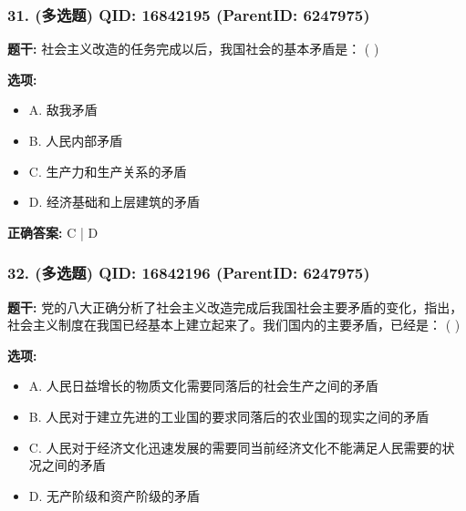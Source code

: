 \documentclass[12pt,UTF8]{ctexart}
\begin{document}
\vspace{0.3em}\hrulefill\vspace{0.7em}

\subsubsection*{31. (多选题) \small QID: 16842195 (ParentID: 6247975)}

\textbf{题干:}
社会主义改造的任务完成以后，我国社会的基本矛盾是： ( )



\textbf{选项:}
\begin{itemize}[leftmargin=*]

  \item A. 敌我矛盾

  \item B. 人民内部矛盾

  \item C. 生产力和生产关系的矛盾

  \item D. 经济基础和上层建筑的矛盾

\end{itemize}

\textbf{正确答案:}
C | D

\vspace{0.3em}\hrulefill\vspace{0.7em}

\subsubsection*{32. (多选题) \small QID: 16842196 (ParentID: 6247975)}

\textbf{题干:}
党的八大正确分析了社会主义改造完成后我国社会主要矛盾的变化，指出，社会主义制度在我国已经基本上建立起来了。我们国内的主要矛盾，已经是： ( )



\textbf{选项:}
\begin{itemize}[leftmargin=*]

  \item A. 人民日益增长的物质文化需要同落后的社会生产之间的矛盾

  \item B. 人民对于建立先进的工业国的要求同落后的农业国的现实之间的矛盾

  \item C. 人民对于经济文化迅速发展的需要同当前经济文化不能满足人民需要的状况之间的矛盾

  \item D. 无产阶级和资产阶级的矛盾

\end{itemize}
\end{document}
